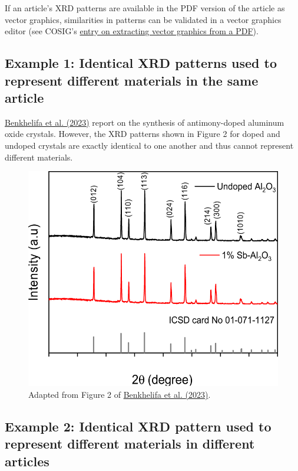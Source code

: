 \documentclass[letterpaper, 12pt]{article}
\begin{document}
If an article's XRD patterns are available in the PDF version of the article as vector graphics, similarities in patterns can be validated in a vector graphics editor (see COSIG's \href{https://osf.io/n8fvw}{entry on extracting vector graphics from a PDF}).

\subsection*{Example 1: Identical XRD patterns used to represent different materials in the same article}

\href{https://doi.org/10.1007/s10971-023-06078-x}{Benkhelifa et al. (2023)} report on the synthesis of antimony-doped aluminum oxide crystals. However, the XRD patterns shown in Figure 2 for doped and undoped crystals are exactly identical to one another and thus cannot represent different materials.

\begin{figure}[h!tbp]
    \centering
    \includegraphics[width=\textwidth]{img/xrd_data_duplication/benkhelifa_figure_2.png}
    \caption*{Adapted from Figure 2 of \href{https://doi.org/10.1007/s10971-023-06078-x}{Benkhelifa et al. (2023)}.}
\end{figure}

\pagebreak

\subsection*{Example 2: Identical XRD pattern used to represent different materials in different articles}
\end{document}
